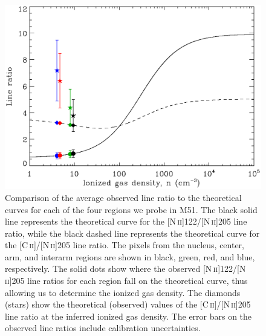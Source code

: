 \begin{figure}
\includegraphics[width=\columnwidth]{ch3/Figure5}
\caption[Comparison of the average observed line ratio to the theoretical curves for each of the four regions we probe in M51]{Comparison of the average observed line ratio to the theoretical curves for each of the four regions we probe in M51.  The black solid line represents the theoretical curve for the [N\,\textsc{ii}]122/[N\,\textsc{ii}]205 line ratio, while the black dashed line represents the theoretical curve for the [C\,\textsc{ii}]/[N\,\textsc{ii}]205 line ratio.  The pixels from the nucleus, center, arm, and interarm regions are shown in black, green, red, and blue, respectively.  The solid dots show where the observed [N\,\textsc{ii}]122/[N\,\textsc{ii}]205 line ratios for each region fall on the theoretical curve, thus allowing us to determine the ionized gas density.  The diamonds (stars) show the theoretical (observed) values of the [C\,\textsc{ii}]/[N\,\textsc{ii}]205 line ratio at the inferred ionized gas density.  The error bars on the observed line ratios include calibration uncertainties.}
\label{fig:line_ratio_compare}
\end{figure}

